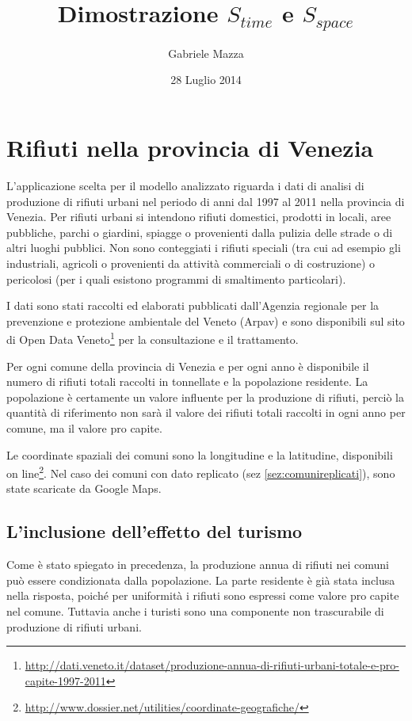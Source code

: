 \documentclass[a4paper,11pt,twoside,openright]{book}							%
\date{28 Luglio 2014}
\author{Gabriele Mazza}
\title{Dimostrazione $S_{time}$ e $S_{space}$}
\begin{document}

\chapter{Rifiuti nella provincia di Venezia}


L'applicazione scelta per il modello analizzato riguarda i dati di analisi di produzione di rifiuti urbani nel periodo di anni dal 1997 al 2011 nella provincia di Venezia. Per rifiuti urbani si intendono rifiuti domestici, prodotti in locali, aree pubbliche, parchi o giardini, spiagge o provenienti dalla pulizia delle strade o di altri luoghi pubblici. Non sono conteggiati i rifiuti speciali (tra cui ad esempio gli industriali, agricoli o provenienti da attività commerciali o di costruzione) o pericolosi (per i quali esistono programmi di smaltimento particolari).

I dati sono stati raccolti ed elaborati pubblicati dall'Agenzia regionale per la prevenzione e protezione ambientale del Veneto (Arpav) e sono disponibili sul sito di Open Data Veneto\footnote{\href{http://dati.veneto.it/dataset/produzione-annua-di-rifiuti-urbani-totale-e-pro-capite-1997-2011}{http://dati.veneto.it/dataset/produzione-annua-di-rifiuti-urbani-totale-e-pro-capite-1997-2011}} per la consultazione e il trattamento.

Per ogni comune della provincia di Venezia e per ogni anno è disponibile il numero di rifiuti totali raccolti in tonnellate e la popolazione residente. La popolazione è certamente un valore influente per la produzione di rifiuti, perciò la quantità di riferimento non sarà il valore dei rifiuti totali raccolti in ogni anno per comune, ma il valore pro capite.

Le coordinate spaziali dei comuni sono la longitudine e la latitudine, disponibili on line\footnote{\href{http://www.dossier.net/utilities/coordinate-geografiche/}{http://www.dossier.net/utilities/coordinate-geografiche/}}. Nel caso dei comuni con dato replicato (sez \ref{sez:comunireplicati}), sono state scaricate da Google Maps.


\section{L'inclusione dell'effetto del turismo}

Come è stato spiegato in precedenza, la produzione annua di rifiuti nei comuni può essere condizionata dalla popolazione. La parte residente è già stata inclusa nella risposta, poiché per uniformità i rifiuti sono espressi come valore pro capite nel comune. Tuttavia anche i turisti sono una componente non trascurabile di produzione di rifiuti urbani.
\end{document}
